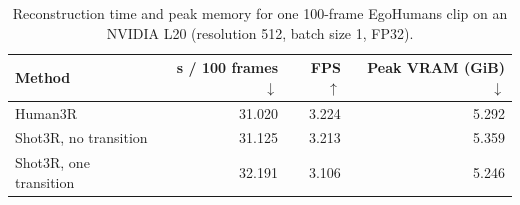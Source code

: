\begin{table}[t]
  \centering
  \supptablesize
  \setlength{\tabcolsep}{4.2pt}
  \caption{Reconstruction time and peak memory for one 100-frame EgoHumans
  clip on an NVIDIA L20 (resolution 512, batch size 1, FP32).}
  \label{tab:standardized-runtime-memory}
  \begin{tabular}{lrrr}
    \toprule
    Method & s / 100 frames $\downarrow$ & FPS $\uparrow$ & Peak VRAM (GiB) $\downarrow$ \\
    \midrule
    Human3R & 31.020 & 3.224 & 5.292 \\
    Shot3R, no transition & 31.125 & 3.213 & 5.359 \\
    Shot3R, one transition & 32.191 & 3.106 & 5.246 \\
    \bottomrule
  \end{tabular}
\end{table}
